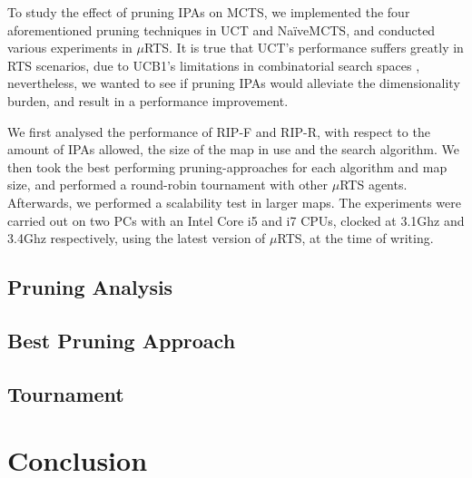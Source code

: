 \documentclass[conference]{IEEEtran}
\newcommand{\mRTS}{$\mu$RTS}
\begin{document}

To study the effect of pruning IPAs on MCTS, we implemented the four aforementioned pruning techniques in UCT and NaïveMCTS, and conducted various experiments in \mRTS{}. It is true that UCT's performance suffers greatly in RTS scenarios, due to UCB1's limitations in combinatorial search spaces \cite{ontanon_combinatorial_2013}, nevertheless, we wanted to see if pruning IPAs would alleviate the dimensionality burden, and result in a performance improvement.

We first analysed the performance of RIP-F and RIP-R, with respect to the amount of IPAs allowed, the size of the map in use and the search algorithm. We then took the best performing pruning-approaches for each algorithm and map size, and performed a round-robin tournament with other \mRTS{} agents. Afterwards, we performed a scalability test in larger maps. The experiments were carried out on two PCs with an Intel Core i5 and i7 CPUs, clocked at 3.1Ghz and 3.4Ghz respectively, using the latest version of \mRTS{}, at the time of writing.

\subsection{Pruning Analysis}






\subsection{Best Pruning Approach}

\subsection{Tournament}

\section{Conclusion}



\end{document}
